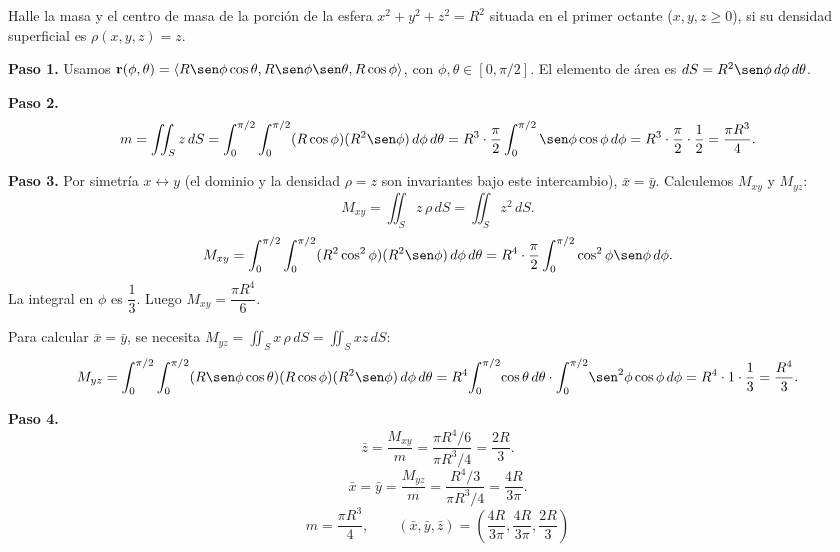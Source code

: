 \begin{example}
Halle la masa y el centro de masa de la porción de la esfera $x^2+y^2+z^2=R^2$ situada en el primer octante ($x,y,z\ge 0$), si su densidad superficial es $\rho(x,y,z)=z$.
\begin{myproof}
\textbf{Paso 1.}
Usamos $\mathbf{r}(\phi,\theta)=\langle R\sen\phi\cos\theta, R\sen\phi\sen\theta, R\cos\phi\rangle$, con $\phi,\theta\in[0,\pi/2]$. El elemento de área es $dS=R^2\sen\phi\,d\phi\,d\theta$.

\textbf{Paso 2.}
\[
m = \iint_S z\,dS
= \int_0^{\pi/2}\int_0^{\pi/2} (R\cos\phi)(R^2\sen\phi)\,d\phi\,d\theta
= R^3 \cdot \frac{\pi}{2} \int_0^{\pi/2} \sen\phi\cos\phi\,d\phi
= R^3 \cdot \frac{\pi}{2} \cdot \frac{1}{2}
= \frac{\pi R^3}{4}.
\]

\textbf{Paso 3.}
Por simetría $x\leftrightarrow y$ (el dominio y la densidad $\rho=z$ son invariantes bajo este intercambio), $\bar{x}=\bar{y}$. Calculemos $M_{xy}$ y $M_{yz}$:
\[
M_{xy} = \iint_S z\,\rho\,dS = \iint_S z^2\,dS.
\]
\[
M_{xy} = \int_0^{\pi/2}\int_0^{\pi/2} (R^2\cos^2\phi)(R^2\sen\phi)\,d\phi\,d\theta
= R^4 \cdot \frac{\pi}{2} \int_0^{\pi/2} \cos^2\phi\sen\phi\,d\phi.
\]
La integral en $\phi$ es $\dfrac{1}{3}$. Luego $M_{xy} = \dfrac{\pi R^4}{6}$.

Para calcular $\bar{x}=\bar{y}$, se necesita $M_{yz} = \iint_S x\,\rho\,dS = \iint_S xz\,dS$:
\[
M_{yz}
= \int_0^{\pi/2}\int_0^{\pi/2}(R\sen\phi\cos\theta)(R\cos\phi)(R^2\sen\phi)\,d\phi\,d\theta
= R^4\!\int_0^{\pi/2}\!\cos\theta\,d\theta\cdot\int_0^{\pi/2}\!\sen^2\phi\cos\phi\,d\phi
= R^4\cdot 1\cdot\frac{1}{3} = \frac{R^4}{3}.
\]

\textbf{Paso 4.}
\[
\bar{z} = \frac{M_{xy}}{m} = \frac{\pi R^4/6}{\pi R^3/4} = \frac{2R}{3}.
\]
\[
\bar{x}=\bar{y} = \frac{M_{yz}}{m} = \frac{R^4/3}{\pi R^3/4} = \frac{4R}{3\pi}.
\]
\[
\boxed{m = \frac{\pi R^3}{4}, \qquad (\bar{x},\bar{y},\bar{z}) = \left(\frac{4R}{3\pi},\frac{4R}{3\pi},\frac{2R}{3}\right)}
\]
\end{myproof}
\end{example}

